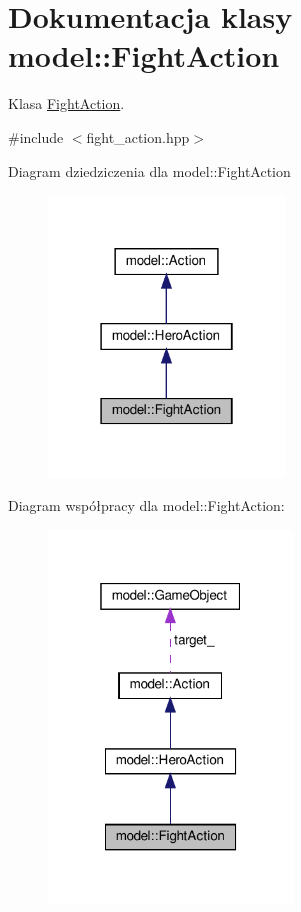 \hypertarget{classmodel_1_1FightAction}{}\section{Dokumentacja klasy model\+:\+:Fight\+Action}
\label{classmodel_1_1FightAction}


Klasa \hyperlink{classmodel_1_1FightAction}{Fight\+Action}.  




{\ttfamily \#include $<$fight\+\_\+action.\+hpp$>$}



Diagram dziedziczenia dla model\+:\+:Fight\+Action\nopagebreak
\begin{figure}[H]
\begin{center}
\leavevmode
\includegraphics[width=178pt]{classmodel_1_1FightAction__inherit__graph}
\end{center}
\end{figure}


Diagram współpracy dla model\+:\+:Fight\+Action\+:\nopagebreak
\begin{figure}[H]
\begin{center}
\leavevmode
\includegraphics[width=184pt]{classmodel_1_1FightAction__coll__graph}
\end{center}
\end{figure}
